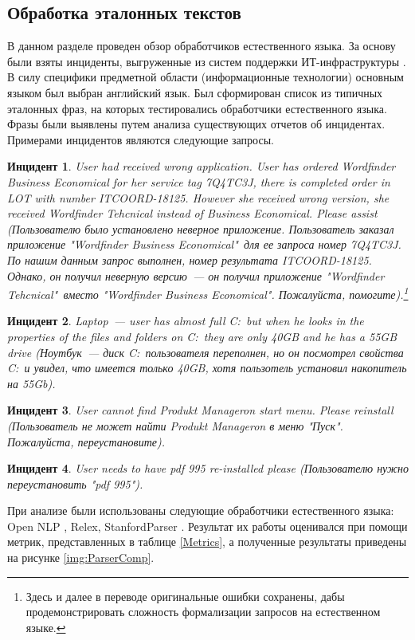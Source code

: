 \subsection{Обработка эталонных текстов} \label{sect2_1}
В данном разделе проведен обзор обработчиков естественного языка. За основу были взяты инциденты, выгруженные из систем поддержки ИТ-инфраструктуры \icl. В силу специфики предметной области (информационные технологии) основным языком был выбран английский язык. Был сформирован список из типичных эталонных фраз, на которых тестировались обработчики естественного языка. Фразы были выявлены путем анализа существующих отчетов об инцидентах. Примерами инцидентов являются следующие запросы.\par
\textbf{Инцидент 1}.
\textit{
User had received wrong application. User has ordered Wordfinder Business Economical for her service tag 7Q4TC3J, there is completed order in LOT with number ITCOORD-18125. However she received wrong version, she received Wordfinder Tehcnical instead of Business Economical. Please assist (Пользователю было установлено неверное приложение. Пользователь заказал приложение "Wordfinder Business Economical"\  для ее запроса номер 7Q4TC3J. По нашим данным запрос выполнен, номер результата ITCOORD-18125. Однако, он получил неверную версию~--- он получил приложение "Wordfinder Tehcnical"\  вместо "Wordfinder Business Economical". Пожалуйста, помогите).\footnote{Здесь и далее в переводе оригинальные ошибки сохранены, дабы продемонстрировать сложность формализации запросов на естественном языке.}
}\par
\textbf{Инцидент 2}.
\textit{
Laptop~--- user has almost full C:\ but when he looks in the properties of the files and folders on C:\ they are only 40GB and he has a 55GB drive (Ноутбук~--- диск C:\ пользователя переполнен, но он посмотрел свойства C:\ и увидел, что имеется только 40GB, хотя пользотель установил накопитель на 55Gb).
}\par
\textbf{Инцидент 3}.
\textit{
User cannot find Produkt Manageron start menu. Please reinstall (Пользователь не может найти Produkt Manageron в меню "Пуск". Пожалуйста, переустановите). 
}\par
\textbf{Инцидент 4}.
\textit{
User needs to have pdf 995 re-installed please (Пользователю нужно переустановить "pdf 995").
}\par

При анализе были использованы следующие обработчики естественного языка: Open NLP \cite{OpenNLP}, Relex\cite{OpenCogRelex}, StanfordParser \cite{StanfordParser}. Результат их работы оценивался при помощи метрик, представленных в таблице \ref{Metrics}, а полученные результаты приведены на рисунке \ref{img:ParserComp}. 


